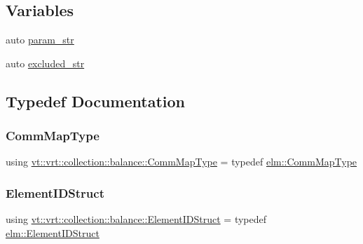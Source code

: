 \subsection*{Variables}
\begin{DoxyCompactItemize}
\item 
auto \hyperlink{namespacevt_1_1vrt_1_1collection_1_1balance_aaed7e09146a45c2932ca185a55161723}{param\+\_\+str}
\item 
auto \hyperlink{namespacevt_1_1vrt_1_1collection_1_1balance_af2f6674ecc7191ddbfe31e87569fe334}{excluded\+\_\+str}
\end{DoxyCompactItemize}


\subsection{Typedef Documentation}
\mbox{\label{namespacevt_1_1vrt_1_1collection_1_1balance_a01ee1fb0ae2da1d2ab7fdca3be9ae351}} 
\subsubsection{\texorpdfstring{Comm\+Map\+Type}{CommMapType}}
{\footnotesize\ttfamily using \hyperlink{namespacevt_1_1vrt_1_1collection_1_1balance_a01ee1fb0ae2da1d2ab7fdca3be9ae351}{vt\+::vrt\+::collection\+::balance\+::\+Comm\+Map\+Type} = typedef \hyperlink{namespacevt_1_1elm_a38487cb8896b9b4763efa9022fab560e}{elm\+::\+Comm\+Map\+Type}}

\mbox{\label{namespacevt_1_1vrt_1_1collection_1_1balance_a9f5b53fafb270212279a4757d2c4cd28}} 
\subsubsection{\texorpdfstring{Element\+I\+D\+Struct}{ElementIDStruct}}
{\footnotesize\ttfamily using \hyperlink{namespacevt_1_1vrt_1_1collection_1_1balance_a9f5b53fafb270212279a4757d2c4cd28}{vt\+::vrt\+::collection\+::balance\+::\+Element\+I\+D\+Struct} = typedef \hyperlink{structvt_1_1elm_1_1_element_i_d_struct}{elm\+::\+Element\+I\+D\+Struct}}

